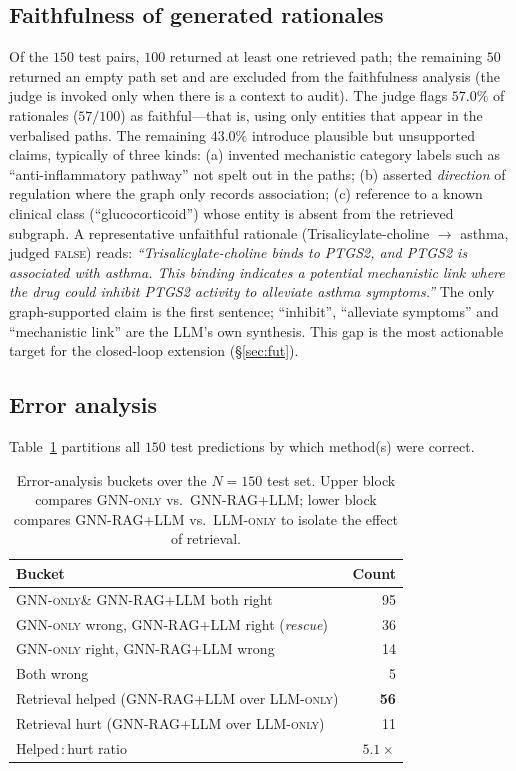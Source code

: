 \documentclass{article}
\newcommand{\ours}{\textsc{GNN-RAG+LLM}\xspace}
\newcommand{\gnno}{\textsc{GNN-only}\xspace}
\newcommand{\llmo}{\textsc{LLM-only}\xspace}
\begin{document}
\subsection{Faithfulness of generated rationales}
\label{sec:exp:faith}

Of the $150$ test pairs, $100$ returned at least one retrieved path; the remaining $50$ returned an empty path set and are excluded from the faithfulness analysis (the judge is invoked only when there is a context to audit). The judge flags $57.0\%$ of rationales ($57/100$) as faithful---that is, using only entities that appear in the verbalised paths. The remaining $43.0\%$ introduce plausible but unsupported claims, typically of three kinds: (a) invented mechanistic category labels such as ``anti-inflammatory pathway'' not spelt out in the paths; (b) asserted \emph{direction} of regulation where the graph only records association; (c) reference to a known clinical class (``glucocorticoid'') whose entity is absent from the retrieved subgraph. A representative unfaithful rationale (Trisalicylate-choline $\to$ asthma, judged \textsc{false}) reads: \emph{``Trisalicylate-choline binds to PTGS2, and PTGS2 is associated with asthma. This binding indicates a potential mechanistic link where the drug could inhibit PTGS2 activity to alleviate asthma symptoms.''} The only graph-supported claim is the first sentence; ``inhibit'', ``alleviate symptoms'' and ``mechanistic link'' are the LLM's own synthesis. This gap is the most actionable target for the closed-loop extension (\S\ref{sec:fut}).

\subsection{Error analysis}
\label{sec:exp:errors}

Table~\ref{tab:buckets} partitions all $150$ test predictions by which method(s) were correct.

\begin{table}[t]
\centering
\small
\caption{Error-analysis buckets over the $N{=}150$ test set. Upper block compares \gnno vs.\ \ours; lower block compares \ours vs.\ \llmo to isolate the effect of retrieval.}
\label{tab:buckets}
\begin{tabular}{@{}lr@{}}
\toprule
Bucket & Count \\
\midrule
\gnno \& \ours both right                  & 95 \\
\gnno wrong, \ours right (\emph{rescue})   & 36 \\
\gnno right, \ours wrong                   & 14 \\
Both wrong                                 & 5  \\
\midrule
Retrieval helped (\ours over \llmo)        & \textbf{56} \\
Retrieval hurt   (\ours over \llmo)        & 11 \\
Helped\,:\,hurt ratio                      & $5.1\times$ \\
\bottomrule
\end{tabular}
\end{table}
\end{document}

